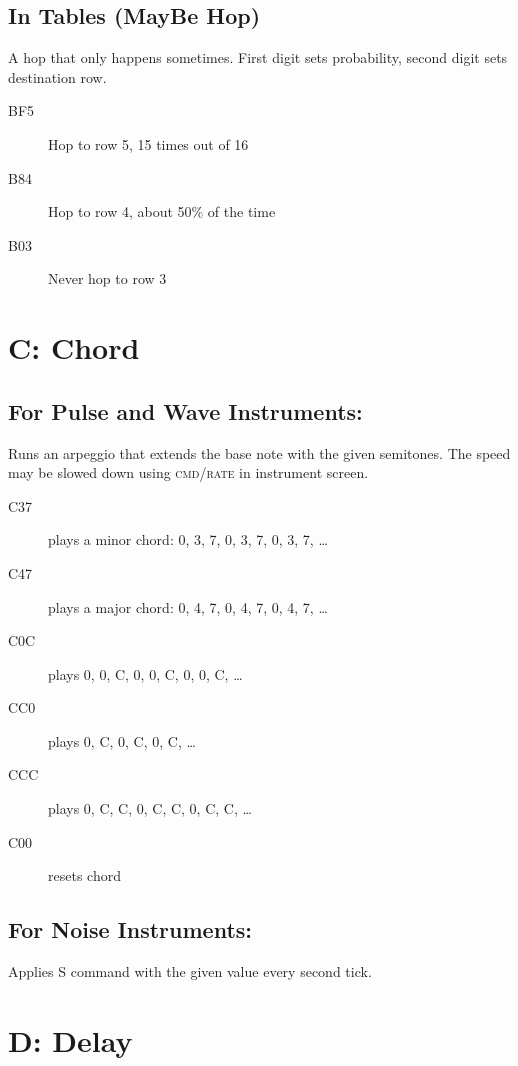 \subsection{In Tables (MayBe Hop)}

A hop that only happens sometimes.
First digit sets probability, second digit
sets destination row.

\begin{description}
    \item[BF5] Hop to row 5, 15 times out of 16
    \item[B84] Hop to row 4, about 50\% of the time
    \item[B03] Never hop to row 3
\end{description}

\section{C: Chord}

\subsection{For Pulse and Wave Instruments:}

\label{command-chord}
Runs an arpeggio that extends the base note with the given semitones. The speed may be slowed down using \textsc{cmd/rate} in instrument screen.

\begin{description}
\item[C37] plays a minor chord: 0, 3, 7, 0, 3, 7, 0, 3, 7, \ldots
\item[C47] plays a major chord: 0, 4, 7, 0, 4, 7, 0, 4, 7, \ldots
\item[C0C] plays 0, 0, C, 0, 0, C, 0, 0, C, \ldots
\item[CC0] plays 0, C, 0, C, 0, C, \ldots
\item[CCC] plays 0, C, C, 0, C, C, 0, C, C, \ldots
\item[C00] resets chord
\end{description}

\subsection{For Noise Instruments:}

Applies S command with the given value every second tick.

\section{D: Delay}


